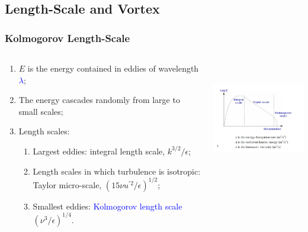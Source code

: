 \documentclass[10pt,compress,handout,ignorenonframetext]{beamer}
\newcommand{\blue}{\textcolor{blue}}
\begin{document}
\subsection{Length-Scale and Vortex}
\begin{frame}
 \frametitle{Kolmogorov Length-Scale}
  \begin{columns}
    \begin{column}[l]{0.5\linewidth}
       \begin{enumerate}%
           \item<1-> $E$ is the energy contained in eddies of wavelength \blue{$\lambda$};
           \item<1-> The energy cascades randomly from large to small scales;
           \item<2-> Length scales:
              \begin{enumerate}%
                  \item<2-> Largest eddies: integral length scale, $k^{3/2}/\epsilon$;
                  \item<2-> Length scales in which turbulence is isotropic: Taylor micro-scale, $\left(15\nu u^{\prime 2}/\epsilon\right)^{1/2}$;
                  \item<2-> Smallest eddies: \blue{Kolmogorov length scale} $\left(\nu^{3}/\epsilon\right)^{1/4}$.
              \end{enumerate}
       \end{enumerate} 
    \end{column}
    \begin{column}[l]{0.5\linewidth}
      \begin{center}
        \includegraphics[width=7.cm, height=5cm, clip]{./Figs/Kolmogorov1}
      \end{center}
    \end{column}

  \end{columns}

\end{frame}
\end{document}
